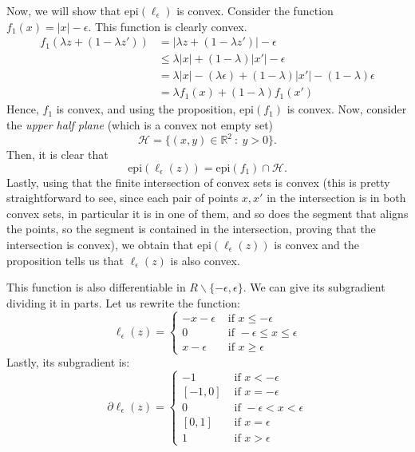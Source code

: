 \documentclass[11pt,table]{article}
\newcommand\abs[1]{\lvert#1\rvert}
\newcommand\R{\mathbb R}
\begin{document}
Now, we will show that \(\text{epi}(\ell_\epsilon)\) is convex. Consider the function \(f_1(x) = \abs{x} - \epsilon\). This function is clearly convex.
\begin{align*}
	f_1(\lambda z + (1-\lambda z')) & = \abs{\lambda z + (1-\lambda z')} - \epsilon                                      \\
	                                & \leq \lambda \abs{x} + (1-\lambda)\abs{x'} - \epsilon                              \\
	                                & = \lambda \abs{x} - (\lambda \epsilon) + (1-\lambda)\abs{x'} - (1-\lambda)\epsilon \\
	                                & = \lambda f_1(x) + (1-\lambda)f_1(x')
\end{align*}
Hence, \(f_1\) is convex, and using the proposition, \(\text{epi}(f_1)\) is convex. Now, consider the \emph{upper half plane} (which is a convex not empty set)
\[
	\mathcal H = \{ (x,y) \in \R^2 \ : \ y > 0\}.
\]
Then, it is clear that
\[
	\text{epi}(\ell_\epsilon(z)) = \text{epi}(f_1) \cap \mathcal H.
\]
Lastly, using that the finite intersection of convex sets is convex (this is pretty straightforward to see, since each pair of points \(x,x'\) in the intersection is in both convex sets, in particular it is in one of them, and so does the segment that aligns the points, so the segment is contained in the intersection, proving that the intersection is convex), we obtain that \(\text{epi}(\ell_\epsilon(z))\) is convex and the proposition tells us that \(\ell_\epsilon(z)\) is also convex.

This function is also differentiable in \(R \backslash \{-\epsilon,\epsilon\}\). We can give its subgradient dividing it in parts. Let us rewrite the function:
\[
	\ell_\epsilon(z) = \begin{cases}
		-x-\epsilon & \text{ if } x \le - \epsilon             \\
		0           & \text{ if } -\epsilon \le x \le \epsilon \\
		x-\epsilon  & \text{ if } x \ge \epsilon
	\end{cases}
\]
Lastly, its subgradient is:
\[
	\partial \ell_\epsilon(z) = \begin{cases}
		-1     & \text{ if } x < - \epsilon           \\
		[-1,0] & \text{ if } x = - \epsilon           \\
		0      & \text{ if } -\epsilon < x < \epsilon \\
		[0,1]  & \text{ if } x = \epsilon             \\
		1      & \text{ if } x> \epsilon
	\end{cases}
\]
\end{document}

